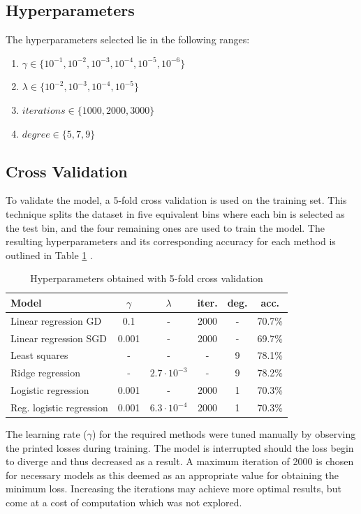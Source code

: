 \documentclass[10pt,conference,compsocconf]{IEEEtran}
\begin{document}
\subsection{Hyperparameters}
The hyperparameters selected lie in the following ranges:
\begin{enumerate}
  \item $\gamma \in \{10^{-1}, 10^{-2}, 10^{-3}, 10^{-4}, 10^{-5}, 10^{-6}\}$
  \item $\lambda \in \{10^{-2}, 10^{-3}, 10^{-4}, 10^{-5}\}$
  \item $iterations \in \{1000, 2000, 3000\}$
  \item $degree \in \{5, 7, 9\}$
\end{enumerate}

\subsection{Cross Validation}
To validate the model, a 5-fold cross validation is used on the training set. This technique splits the dataset in five equivalent bins where each bin is selected as the test bin, and the four remaining ones are used to train the model. The resulting hyperparameters and its corresponding accuracy for each method is outlined in Table \ref{tab:hyper} . 

\begin{table}[h!]
  \centering
  \caption{Hyperparameters obtained with 5-fold cross validation}
  \begin{tabular}{|l||c|c|c|c|c|}
      \hline
      \textbf{Model} & \textbf{$\gamma$} & \textbf{$\lambda$} & \textbf{iter.} & \textbf{deg.} & \textbf{acc.}\\ \hline\hline
      Linear regression GD & 0.1 & - & 2000 & - & 70.7\%\\ \hline
      Linear regression SGD & 0.001 & - & 2000 & - & 69.7\%\\ \hline
      Least squares & - & - & - & 9 & 78.1\%\\ \hline
      Ridge regression & - & $2.7\cdot10^{-3}$ & - & 9 & 78.2\%\\ \hline
      Logistic regression & 0.001 & - & 2000 & 1 & 70.3\%\\ \hline
      Reg. logistic regression & 0.001 & $6.3\cdot10^{-4}$ & 2000 & 1 & 70.3\%\\ \hline
  \end{tabular}
  \label{tab:hyper}
\end{table} 

The learning rate ($\gamma$) for the required methods were tuned manually by observing the printed losses during training. The model is interrupted should the loss begin to diverge and thus decreased as a result. A maximum iteration of 2000 is chosen for necessary models as this deemed as an appropriate value for obtaining the minimum loss. Increasing the iterations may achieve more optimal results, but come at a cost of computation which was not explored.
\end{document}
